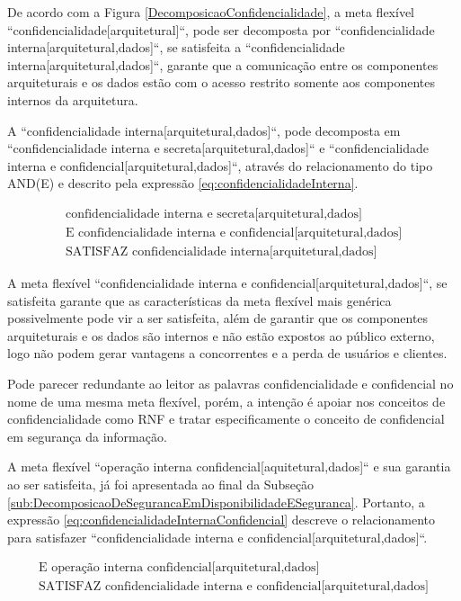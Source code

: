 De acordo com a Figura \ref{DecomposicaoConfidencialidade}, a meta flexível ``confidencialidade[arquitetural]``, pode ser decomposta por ``confidencialidade interna[arquitetural,dados]``, se satisfeita a ``confidencialidade interna[arquitetural,dados]``, garante que a comunicação entre os componentes arquiteturais e os dados estão com o acesso restrito somente aos componentes internos da arquitetura. 

A ``confidencialidade interna[arquitetural,dados]``, pode decomposta em ``confidencialidade interna e secreta[arquitetural,dados]`` e ``confidencialidade interna e confidencial[arquitetural,dados]``, através do relacionamento do tipo AND(E) e descrito pela expressão \ref{eq:confidencialidadeInterna}.   

\begin{eqnarray}
\label{eq:confidencialidadeInterna}
\textrm{confidencialidade interna e secreta[arquitetural,dados]}  \nonumber\\
\textrm{E confidencialidade interna e confidencial[arquitetural,dados]} \nonumber\\
\textrm{SATISFAZ confidencialidade interna[arquitetural,dados]}
\end{eqnarray}

A meta flexível ``confidencialidade interna e confidencial[arquitetural,dados]``, se satisfeita garante que as características da meta flexível mais genérica possivelmente pode vir a ser satisfeita, além de garantir que os componentes arquiteturais e os dados são internos e não estão expostos ao público externo, logo não podem gerar vantagens a concorrentes e a perda de usuários e clientes. 

Pode parecer redundante ao leitor as palavras confidencialidade e confidencial no nome de uma mesma meta flexível, porém, a intenção é apoiar nos conceitos de confidencialidade como RNF e tratar especificamente o conceito de confidencial em segurança da informação. 

A meta flexível ``operação interna confidencial[aquitetural,dados]`` e sua garantia ao ser satisfeita, já foi apresentada ao final da Subseção \ref{sub:DecomposicaoDeSegurancaEmDisponibilidadeESeguranca}. Portanto, a expressão \ref{eq:confidencialidadeInternaConfidencial} descreve o relacionamento para satisfazer ``confidencialidade interna e confidencial[arquitetural,dados]``.

\begin{eqnarray}
\label{eq:confidencialidadeInternaConfidencial}
\textrm{E operação interna confidencial[arquitetural,dados]} \nonumber\\
\textrm{SATISFAZ confidencialidade interna e confidencial[arquitetural,dados]}
\end{eqnarray}  

